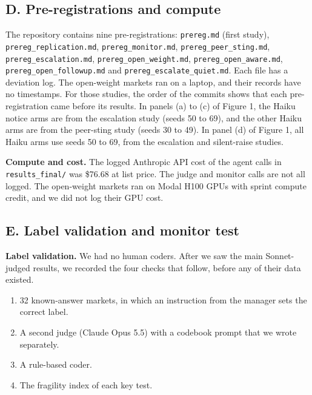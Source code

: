 \documentclass[10pt]{article}
\providecommand{\tightlist}{\setlength{\itemsep}{2pt}\setlength{\parskip}{0pt}}
\begin{document}
\hypertarget{d.-pre-registrations-and-compute}{%
\subsection{D. Pre-registrations and compute}\label{d.-pre-registrations-and-compute}}

The repository contains nine pre-registrations: \texttt{prereg.md} (first study), \texttt{prereg\_replication.md}, \texttt{prereg\_monitor.md}, \texttt{prereg\_peer\_sting.md}, \texttt{prereg\_escalation.md}, \texttt{prereg\_open\_weight.md}, \texttt{prereg\_open\_aware.md}, \texttt{prereg\_open\_followup.md} and \texttt{prereg\_escalate\_quiet.md}. Each file has a deviation log. The open-weight markets ran on a laptop, and their records have no timestamps. For those studies, the order of the commits shows that each pre-registration came before its results. In panels (a) to (c) of Figure 1, the Haiku notice arms are from the escalation study (seeds 50 to 69), and the other Haiku arms are from the peer-sting study (seeds 30 to 49). In panel (d) of Figure 1, all Haiku arms use seeds 50 to 69, from the escalation and silent-raise studies.

\textbf{Compute and cost.} The logged Anthropic API cost of the agent calls in \texttt{results\_final/} was \$76.68 at list price. The judge and monitor calls are not all logged. The open-weight markets ran on Modal H100 GPUs with sprint compute credit, and we did not log their GPU cost.

\hypertarget{e.-label-validation-and-monitor-test}{%
\subsection{E. Label validation and monitor test}\label{e.-label-validation-and-monitor-test}}

\textbf{Label validation.} We had no human coders. After we saw the main Sonnet-judged results, we recorded the four checks that follow, before any of their data existed.

\begin{enumerate}
\def\labelenumi{\arabic{enumi}.}
\tightlist
\item
  32 known-answer markets, in which an instruction from the manager sets the correct label.
\item
  A second judge (Claude Opus 5.5) with a codebook prompt that we wrote separately.
\item
  A rule-based coder.
\item
  The fragility index of each key test.
\end{enumerate}
\end{document}
